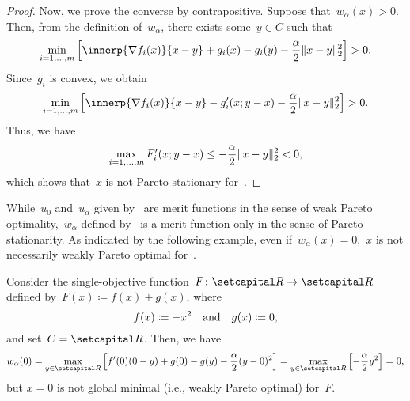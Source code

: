\documentclass[../../main]{subfiles}
\begin{document}
\begin{proof}
                Now, we prove the converse by contrapositive.
                Suppose that~$w_\alpha(x) > 0$.
                Then, from the definition of~$w_\alpha$, there exists some~$y \in C$ such that
                \begin{equation}
                    \min_{i = 1, \dots, m} \left[ \innerp{\nabla f_i(x)}{x - y} + g_i(x) - g_i(y) - \frac{\alpha}{2} \norm{x - y}_2^2 \right] > 0
                .\end{equation} 
                Since~$g_i$ is convex, we obtain
                \begin{equation}
                    \min_{i = 1, \dots, m} \left[ \innerp{\nabla f_i(x)}{x - y} - g_i'(x; y - x) - \frac{\alpha}{2} \norm{x - y}_2^2 \right] > 0
                .\end{equation} 
                Thus, we have
                \begin{equation}
                    \max_{i = 1, \dots, m} F_i'(x; y - x) \le - \frac{\alpha}{2} \lVert x - y\rVert_2^2 < 0
                ,\end{equation} 
                which shows that~$x$ is not Pareto stationary for~.
            \end{proof}
            While~$u_0$ and~$u_\alpha$ given by~ are merit functions in the sense of weak Pareto optimality,~$w_\alpha$ defined by~ is a merit function only in the sense of Pareto stationarity.
            As indicated by the following example, even if~$w_\alpha(x) = 0$,~$x$ is not necessarily weakly Pareto optimal for~.
            \begin{example}
                Consider the single-objective function~$F\colon \setR \to \setR$ defined by~$F(x) \coloneqq f(x) + g(x)$, where
                \begin{equation}
                    f(x) \coloneqq - x^2 \quad \text{and} \quad g(x) \coloneqq 0
                ,\end{equation}
                and set~$C = \setR$.
                Then, we have
                \begin{equation}
                    w_\alpha(0) = \max_{y \in \setR} \left[ f'(0) (0 - y) + g(0) - g(y) - \frac{\alpha}{2} (y - 0)^2 \right] 
                    = \max_{y \in \setR} \left[ - \frac{\alpha}{2} y^2 \right] = 0
                ,\end{equation} 
                but $x = 0$ is not global minimal (i.e., weakly Pareto optimal) for~$F$.
            \end{example}
\end{document}
